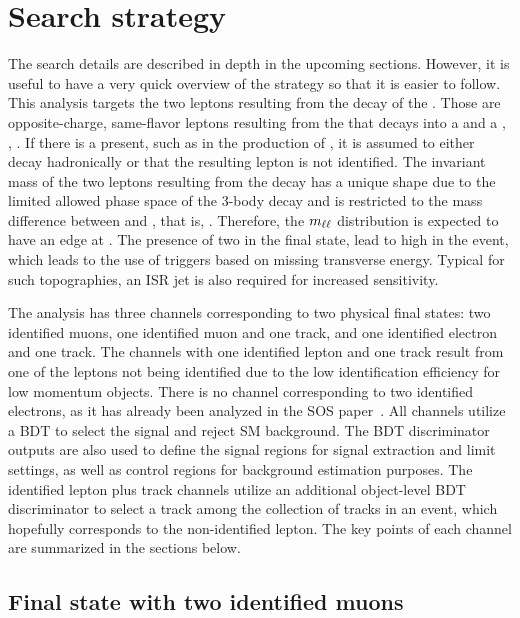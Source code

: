 \clearpage
\section{Search strategy}
\label{sec:search-strategy}

The search details are described in depth in the upcoming sections. However, it is useful to have a very quick overview of the strategy so that it is easier to follow. This analysis targets the two leptons resulting from the decay of the \neutt. Those are opposite-charge, same-flavor leptons \ellell resulting from the \neutt that decays into a \neuto and a \PZstar, \ie, \neuttdecay. If there is a \chargino present, such as in the production of \tchiwz, it is assumed to either decay hadronically or that the resulting lepton is not identified. The invariant mass of the two leptons resulting from the decay has a unique shape due to the limited allowed phase space of the 3-body decay and is restricted to the mass difference between \neutt and \neuto, that is, \dm. Therefore, the $m_{\ell\ell}$ distribution is expected to have an edge at \dm. The presence of two \neuto in the final state, lead to high \MET in the event, which leads to the use of triggers based on missing transverse energy. Typical for such topographies, an ISR jet is also required for increased sensitivity.

The analysis has three channels corresponding to two physical final states: two identified muons, one identified muon and one track, and one identified electron and one track. The channels with one identified lepton and one track result from one of the leptons not being identified due to the low identification efficiency for low momentum objects. There is no channel corresponding to two identified electrons, as it has already been analyzed in the SOS paper~\cite{sos}. All channels utilize a BDT to select the signal and reject SM background. The BDT discriminator outputs are also used to define the signal regions for signal extraction and limit settings, as well as control regions for background estimation purposes. The identified lepton plus track channels utilize an additional object-level BDT discriminator to select a track among the collection of tracks in an event, which hopefully corresponds to the non-identified lepton. The key points of each channel are summarized in the sections below.


\subsection{Final state with two identified muons}
\label{sec:dimuon-category}

